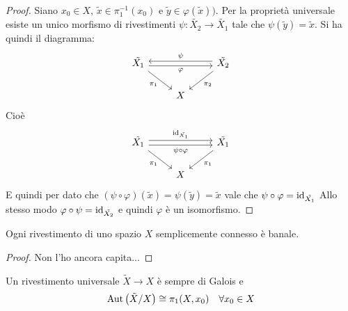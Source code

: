 \documentclass[]{article}
\begin{document}
\begin{proof} \nl
    Siano $x_0 \in X$, $\tilde{x} \in \pi_1^{-1}(x_0)$ e $\tilde{y} \in \varphi(\tilde{x}))$. \nl
    Per la propriet\`a universale esiste un unico morfismo di rivestimenti $\psi: \tilde{X_2} \to \tilde{X_1}$ tale che
    $\psi(\tilde{y}) = \tilde{x}$. \nl
    Si ha quindi il diagramma:
    \[\begin{tikzcd}
	{\tilde{X_1}} && {\tilde{X_2}} \\
	& X
	\arrow["\varphi"', shift right, from=1-1, to=1-3]
	\arrow["{\pi_1}"', from=1-1, to=2-2]
	\arrow["\psi"', shift right, from=1-3, to=1-1]
	\arrow["{\pi_2}", from=1-3, to=2-2]
\end{tikzcd}\]
    Cio\`e
    \[\begin{tikzcd}
	{\tilde{X_1}} && {\tilde{X_1}} \\
	& X
	\arrow["{\psi \circ \varphi}"', shift right, from=1-1, to=1-3]
	\arrow["{\id_{\tilde{X_1}}}", shift left, from=1-1, to=1-3]
	\arrow["{\pi_1}"', from=1-1, to=2-2]
	\arrow["{\pi_1}", from=1-3, to=2-2]
    \end{tikzcd}\]
    E quindi per dato che $(\psi \circ \varphi) (\tilde{x}) = \psi (\tilde{y}) = \tilde{x}$ vale che $\psi \circ \varphi = \mathrm{id}_{\tilde{X_1}}$\nl
    Allo stesso modo $\varphi \circ \psi = \mathrm{id}_{\tilde{X_2}}$ e quindi $\varphi$ \`e un isomorfismo.
\end{proof}

\begin{corollary} \nl
    Ogni rivestimento di uno spazio $X$ semplicemente connesso \`e banale.
\end{corollary}

\begin{proof} \nl
    Non l'ho ancora capita...
\end{proof}

\begin{theorem}  \nl
    Un rivestimento universale $\tilde{X} \to X$ \`e sempre di Galois e 
    \[
        \mathrm{Aut}\left(\tilde{X}/X\right) \cong \pi_1(X, x_0) \quad \forall x_0 \in X
    \]
\end{theorem}
\end{document}
